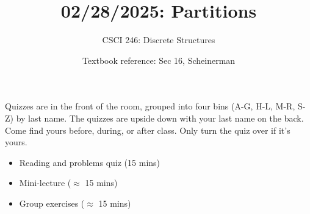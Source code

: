 \documentclass[10pt]{beamer}
\begin{document}






\title{02/28/2025: Partitions}
\author{CSCI 246: Discrete Structures}
\date{Textbook reference: Sec 16, Scheinerman}

\begin{frame}
    \titlepage 
\end{frame}


\begin{frame}
\footnotesize 
\begin{mygreenbox}[title=Graded Quiz Pickup]
Quizzes are in the front of the room, grouped into four bins (A-G, H-L, M-R, S-Z) by last name. The quizzes are upside down with your last name on the back. Come find yours before, during, or after class.  Only turn the quiz over if it's yours.
\end{mygreenbox} 
\vfill 

%
%
%
%


\begin{myyellowbox}[title=Today's Agenda]
\begin{itemize}
	\item Reading and problems quiz (15 mins)
	\item Mini-lecture ($\approx$ 15 mins)
	\item Group exercises ($\approx$ 15 mins)
\end{itemize}

%	
\end{myyellowbox}
\vfill 

\end{frame}
\end{document}
